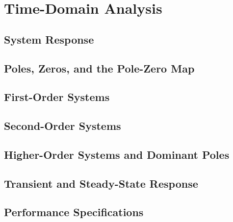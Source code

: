 \chapter{Time-Domain Analysis} \label{ch:time_domain}

    \section{System Response}

    \section{Poles, Zeros, and the Pole-Zero Map}   %

    \section{First-Order Systems}

    \section{Second-Order Systems}

    \section{Higher-Order Systems and Dominant Poles}

    \section{Transient and Steady-State Response}

    \section{Performance Specifications}